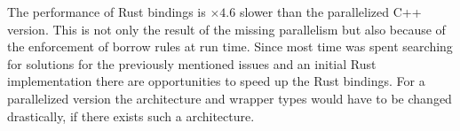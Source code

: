 \documentclass[thesis]{subfiles}
\begin{document}
The performance of Rust bindings is $\times 4.6$ slower than the parallelized C++ version.
This is not only the result of the missing parallelism but also because of the enforcement of borrow rules at run time.
Since most time was spent searching for solutions for the previously mentioned issues and an initial Rust implementation there are opportunities to speed up the Rust bindings.
For a parallelized version the architecture and wrapper types would have to be changed drastically, if there exists such a architecture.
\end{document}
